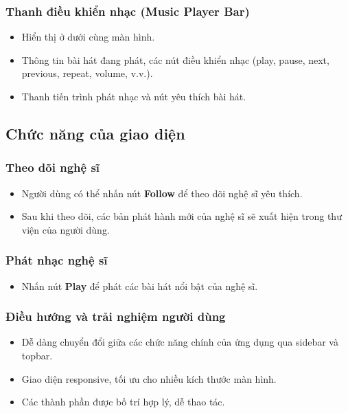 \documentclass{book}
\begin{document}
\subsubsection{Thanh điều khiển nhạc (Music Player Bar)}
\begin{itemize}
    \item Hiển thị ở dưới cùng màn hình.
    \item Thông tin bài hát đang phát, các nút điều khiển nhạc (play, pause, next, previous, repeat, volume, v.v.).
    \item Thanh tiến trình phát nhạc và nút yêu thích bài hát.
\end{itemize}

\subsection{Chức năng của giao diện}

\subsubsection{Theo dõi nghệ sĩ}
\begin{itemize}
    \item Người dùng có thể nhấn nút \textbf{Follow} để theo dõi nghệ sĩ yêu thích.
    \item Sau khi theo dõi, các bản phát hành mới của nghệ sĩ sẽ xuất hiện trong thư viện của người dùng.
\end{itemize}

\subsubsection{Phát nhạc nghệ sĩ}
\begin{itemize}
    \item Nhấn nút \textbf{Play} để phát các bài hát nổi bật của nghệ sĩ.
\end{itemize}

\subsubsection{Điều hướng và trải nghiệm người dùng}
\begin{itemize}
    \item Dễ dàng chuyển đổi giữa các chức năng chính của ứng dụng qua sidebar và topbar.
    \item Giao diện responsive, tối ưu cho nhiều kích thước màn hình.
    \item Các thành phần được bố trí hợp lý, dễ thao tác.
\end{itemize}
\end{document}
